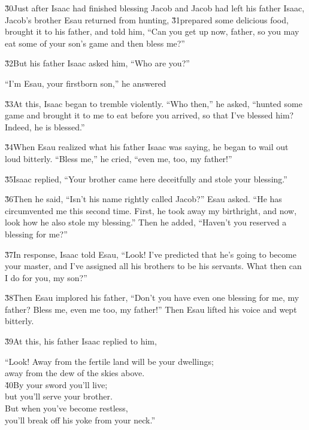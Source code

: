 \v{30}Just after Isaac had finished blessing Jacob and Jacob had left his father Isaac, Jacob's brother Esau returned from hunting, \v{31}prepared some delicious food, brought it to his father, and told him, ``Can you get up now, father, so you may eat some of your son's game and then bless me?''

\v{32}But his father Isaac asked him, ``Who are you?''

``I'm Esau, your firstborn son,'' he answered

\v{33}At this, Isaac began to tremble violently. ``Who then,'' he asked, ``hunted some game and brought it to me to eat before you arrived, so that I've blessed him? Indeed, he is blessed.''

\v{34}When Esau realized what his father Isaac was saying, he began to wail out loud bitterly. ``Bless me,'' he cried, ``even me, too, my father!''

\v{35}Isaac replied, ``Your brother came here deceitfully and stole your blessing.''

\v{36}Then he said, ``Isn't his name rightly called Jacob?'' Esau asked. ``He has circumvented me this second time. First, he took away my birthright, and now, look how he also stole my blessing.'' Then he added, ``Haven't you reserved a blessing for me?''

\v{37}In response, Isaac told Esau, ``Look! I've predicted that he's going to become your master, and I've assigned all his brothers to be his servants. What then can I do for you, my son?''

\v{38}Then Esau implored his father, ``Don't you have even one blessing for me, my father? Bless me, even me too, my father!'' Then Esau lifted his voice and wept bitterly.

\v{39}At this, his father Isaac replied to him,

\begin{poetry}
\poeml ``Look! Away from the fertile land will be your dwellings; \\
\poemll    away from the dew of the skies above. \\
\poeml \v{40}By your sword you'll live; \\
\poemll    but you'll serve your brother. \\
\poeml But when you've become restless, \\
\poemll    you'll break off his yoke from your neck.''
\end{poetry}

